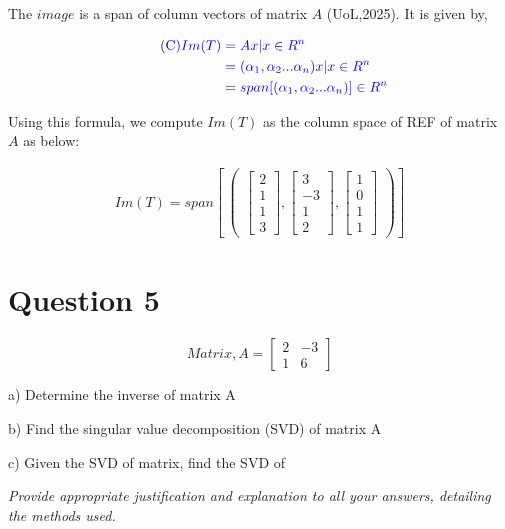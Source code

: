 \documentclass[a4paper]{report}
\begin{document}
The $image$ is a span of column vectors of matrix $A$ (UoL,2025). It is given by,

\begin{align*} \tag{\color{blue}C}
    \color{blue} Im(T)&\color{blue}=Ax|x\in R^n\\
    &\color{blue}=(\alpha_1,\alpha_2...\alpha_n)x|x\in R^n \\
    &=\color{blue} span[(\alpha_1,\alpha_2...\alpha_n)] \in R^n
\end{align*}


Using this formula, we compute $Im(T)$ as the column space of REF of matrix $A$ as below:

\begin{align*}
\boxed{
    Im(T)=span[\ \begin{pmatrix} \begin{bmatrix}
        2\\1\\1\\3
    \end{bmatrix},\begin{bmatrix}
        3\\-3\\1\\2
    \end{bmatrix}, \begin{bmatrix}
        1\\0\\1\\1
    \end{bmatrix}\end{pmatrix}  ]}
\end{align*}

\vspace{10mm}

\section*{Question 5}

 \[Matrix ,A=\begin{bmatrix}
    2&-3\\1&6
\end{bmatrix}\]

a) Determine the inverse of matrix A 

b) Find the singular value decomposition (SVD) of matrix A 

c) Given the SVD of matrix, find the SVD of  

\textit{Provide appropriate justification and explanation to all your answers, detailing the methods used.}
\end{document}
